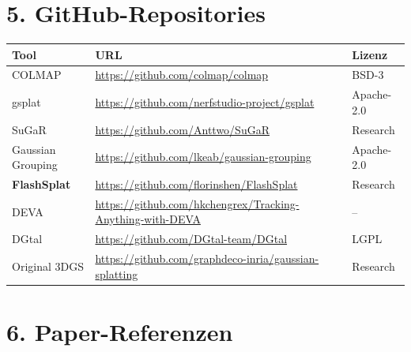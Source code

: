 \documentclass[11pt, a4paper]{article}
\begin{document}
\section{5. GitHub-Repositories}

\begin{center}
\small
\begin{tabular}{|p{3cm}|p{8cm}|p{2cm}|}
\hline
\textbf{Tool} & \textbf{URL} & \textbf{Lizenz} \\
\hline
COLMAP & \url{https://github.com/colmap/colmap} & BSD-3 \\
\hline
gsplat & \url{https://github.com/nerfstudio-project/gsplat} & Apache-2.0 \\
\hline
SuGaR & \url{https://github.com/Anttwo/SuGaR} & Research \\
\hline
Gaussian Grouping & \url{https://github.com/lkeab/gaussian-grouping} & Apache-2.0 \\
\hline
\textbf{FlashSplat} & \url{https://github.com/florinshen/FlashSplat} & Research \\
\hline
DEVA & \url{https://github.com/hkchengrex/Tracking-Anything-with-DEVA} & -- \\
\hline
DGtal & \url{https://github.com/DGtal-team/DGtal} & LGPL \\
\hline
Original 3DGS & \url{https://github.com/graphdeco-inria/gaussian-splatting} & Research \\
\hline
\end{tabular}
\end{center}

\section{6. Paper-Referenzen}
\end{document}
